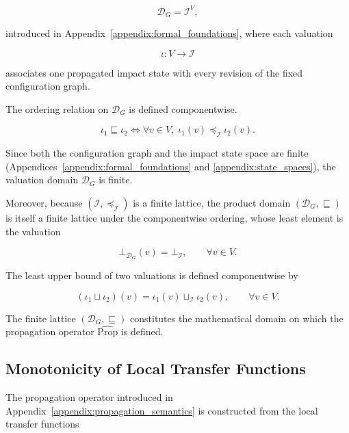 \documentclass[10pt]{article}
\begin{document}
	\[
	\mathcal D_G
	=
	\mathcal I^V,
	\]
	
	introduced in Appendix~\ref{appendix:formal_foundations}, where each valuation
	
	\[
	\iota : V \rightarrow \mathcal I
	\]
	
	associates one propagated impact state with every revision of the fixed
	configuration graph.
	
	The ordering relation on $\mathcal D_G$ is defined componentwise.
	
	\begin{equation}
		\label{eq:product_order}
		\iota_1
		\sqsubseteq
		\iota_2
		\iff
		\forall v\in V,\;
		\iota_1(v)
		\preceq_{\mathcal I}
		\iota_2(v).
	\end{equation}
	
	Since both the configuration graph and the impact state space are finite
	(Appendices~\ref{appendix:formal_foundations} and
	\ref{appendix:state_spaces}), the valuation domain
	$\mathcal D_G$ is finite.
	
	Moreover, because
	$\left(\mathcal I,\preceq_{\mathcal I}\right)$
	is a finite lattice, the product domain
	$\left(\mathcal D_G,\sqsubseteq\right)$
	is itself a finite lattice under the componentwise ordering, whose least
	element is the valuation
	
	\begin{equation}
		\label{eq:bottom_valuation}
		\bot_{\mathcal D_G}(v)
		=
		\bot_{\mathcal I},
		\qquad
		\forall v\in V.
	\end{equation}
	
	The least upper bound of two valuations is defined componentwise by
	
	\begin{equation}
		\label{eq:valuation_join}
		(\iota_1
		\sqcup
		\iota_2)(v)
		=
		\iota_1(v)
		\sqcup_{\mathcal I}
		\iota_2(v),
		\qquad
		\forall v\in V.
	\end{equation}
	
	The finite lattice
	$\left(\mathcal D_G,\sqsubseteq\right)$
	constitutes the mathematical domain on which the propagation operator
	$\widehat{\mathrm{Prop}}$ is defined.
	
	\subsection{Monotonicity of Local Transfer Functions}
	\label{appendix:local_monotonicity}
	The propagation operator introduced in
	Appendix~\ref{appendix:propagation_semantics}
	is constructed from the local transfer functions
	
\end{document}
